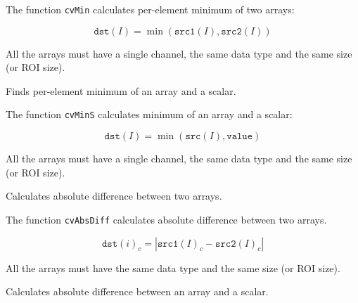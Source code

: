 The function \texttt{cvMin} calculates per-element minimum of two arrays:

\[
\texttt{dst}(I)=\min(\texttt{src1}(I),\texttt{src2}(I))
\]

All the arrays must have a single channel, the same data type and the same size (or ROI size).


\label{MinS}

Finds per-element minimum of an array and a scalar.


\begin{description}
\end{description}

The function \texttt{cvMinS} calculates minimum of an array and a scalar:

\[
\texttt{dst}(I)=\min(\texttt{src}(I), \texttt{value})
\]

All the arrays must have a single channel, the same data type and the same size (or ROI size).

\label{AbsDiff}

Calculates absolute difference between two arrays.


\begin{description}
\end{description}

The function \texttt{cvAbsDiff} calculates absolute difference between two arrays.

\[ \texttt{dst}(i)_c = |\texttt{src1}(I)_c - \texttt{src2}(I)_c| \]

All the arrays must have the same data type and the same size (or ROI size).

\label{AbsDiffS}

Calculates absolute difference between an array and a scalar.


